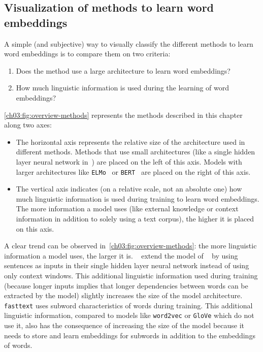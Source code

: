   \subsection{Visualization of methods to learn word embeddings}
    A simple (and subjective) way to visually classify the different methods to
    learn word embeddings is to compare them on two criteria:

    \begin{enumerate}
      \item Does the method use a large architecture to learn word embeddings?
      \item How much linguistic information is used during the learning of word
        embeddings?
    \end{enumerate}

    \noindent \autoref{ch03:fig:overview-methods} represents the methods
    described in this chapter along two axes:

    \begin{itemize}
      \item The horizontal axis represents the relative size of the architecture
        used in different methods. Methods that use small architectures (like a
        single hidden layer neural network in~\citep{collobert2008unified}) are
        placed on the left of this axis. Models with larger architectures like
        \texttt{ELMo}~\citep{peters2018elmo} or
        \texttt{BERT}~\citep{devlin2019bert} are placed on the right of this
        axis.
      \item The vertical axis indicates (on a relative scale, not an absolute
        one) how much linguistic information is used during training to learn
        word embeddings. The more information a model uses (like external
        knowledge or context information in addition to solely using a text
        corpus), the higher it is placed on this axis.
    \end{itemize}

    A clear trend can be observed in~\autoref{ch03:fig:overview-methods}: the
    more linguistic information a model uses, the larger it is.
    \citeauthor{collobert2011natural}~\citep{collobert2011natural} extend the
    model of \citeauthor{collobert2008unified}~\citep{collobert2008unified} by
    using sentences as inputs in their single hidden layer neural network
    instead of using only context windows. This additional linguistic
    information used during training (because longer inputs implies that longer
    dependencies between words can be extracted by the model) slightly increases
    the size of the model architecture. \texttt{fasttext} uses subword
    characteristics of words during training. This additional linguistic
    information, compared to models like \texttt{word2vec} or \texttt{GloVe}
    which do not use it, also has the consequence of increasing the size of the
    model because it needs to store and learn embeddings for subwords in
    addition to the embeddings of words. \medskip

